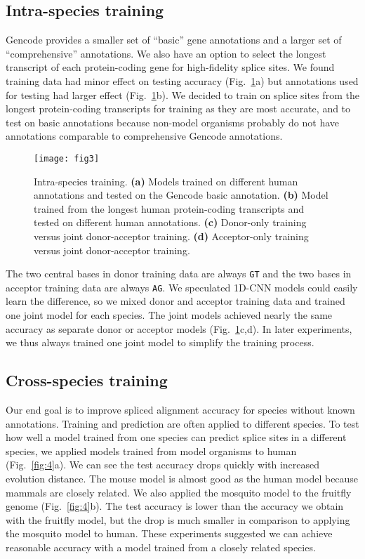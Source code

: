 \documentclass[webpdf,contemporary,large,namedate]{oup-authoring-template}%
\begin{document}
\subsection{Intra-species training}

Gencode provides a smaller set of ``basic'' gene annotations and a larger set of ``comprehensive'' annotations.
We also have an option to select the longest transcript of each protein-coding gene for high-fidelity splice sites.
We found training data had minor effect on testing accuracy (Fig.~\ref{fig:3}a)
but annotations used for testing had larger effect (Fig.~\ref{fig:3}b).
We decided to train on splice sites from the longest protein-coding transcripts for training as they are most accurate,
and to test on basic annotations because non-model organisms probably do not have annotations comparable to comprehensive Gencode annotations.

\begin{figure}[tb]
\texttt{[image: fig3]}
\caption{Intra-species training.
{\bf (a)} Models trained on different human annotations
and tested on the Gencode basic annotation.
{\bf (b)} Model trained from the longest human protein-coding transcripts
and tested on different human annotations.
{\bf (c)} Donor-only training versus joint donor-acceptor training.
{\bf (d)} Acceptor-only training versus joint donor-acceptor training.}\label{fig:3}
\end{figure}

The two central bases in donor training data are always {\tt GT}
and the two bases in acceptor training data are always {\tt AG}.
We speculated 1D-CNN models could easily learn the difference, so we mixed donor and acceptor training data
and trained one joint model for each species.
The joint models achieved nearly the same accuracy as separate donor or acceptor models (Fig.~\ref{fig:3}c,d).
In later experiments, we thus always trained one joint model to simplify the training process.

\subsection{Cross-species training}

Our end goal is to improve spliced alignment accuracy for species without known annotations.
Training and prediction are often applied to different species.
To test how well a model trained from one species can predict splice sites in a different species,
we applied models trained from model organisms to human (Fig.~\ref{fig:4}a).
We can see the test accuracy drops quickly with increased evolution distance.
The mouse model is almost good as the human model because mammals are closely related.
We also applied the mosquito model to the fruitfly genome (Fig.~\ref{fig:4}b).
The test accuracy is lower than the accuracy we obtain with the fruitfly model,
but the drop is much smaller in comparison to applying the mosquito model to human.
These experiments suggested we can achieve reasonable accuracy with a model trained from a closely related species.
\end{document}
